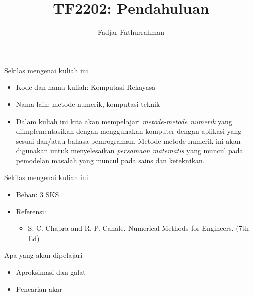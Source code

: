 

\title{TF2202: Pendahuluan}
\author{Fadjar Fathurrahman}
\date{}



\frame{\titlepage}
\ifdefined\Shaded\renewenvironment{Shaded}{\begin{tcolorbox}[enhanced, borderline west={3pt}{0pt}{shadecolor}, interior hidden, sharp corners, boxrule=0pt, frame hidden, breakable]}{\end{tcolorbox}}\fi

\begin{frame}{Sekilas mengenai kuliah ini}
\protect\hypertarget{sekilas-mengenai-kuliah-ini}{}
\begin{itemize}
\item
  Kode dan nama kuliah: Komputasi Rekayasa
\item
  Nama lain: metode numerik, komputasi teknik
\item
  Dalam kuliah ini kita akan mempelajari \emph{metode-metode numerik}
  yang diimplementasikan dengan menggunakan komputer dengan aplikasi
  yang sesuai dan/atau bahasa pemrograman. Metode-metode numerik ini
  akan digunakan untuk menyelesaikan \emph{persamaan matematis} yang
  muncul pada pemodelan masalah yang muncul pada sains dan keteknikan.
\end{itemize}
\end{frame}

\begin{frame}{Sekilas mengenai kuliah ini}
\protect\hypertarget{sekilas-mengenai-kuliah-ini-1}{}
\begin{itemize}
\item
  Beban: 3 SKS
\item
  Referensi:

  \begin{itemize}
  \tightlist
  \item
    S. C. Chapra and R. P. Canale. Numerical Methods for Engineers. (7th
    Ed)
  \end{itemize}
\end{itemize}
\end{frame}

\begin{frame}{Apa yang akan dipelajari}
\protect\hypertarget{apa-yang-akan-dipelajari}{}
\begin{itemize}
\item
  Aproksimasi dan galat
\item
  Pencarian akar
\end{itemize}
\end{frame}




